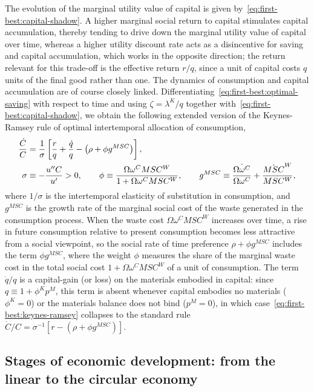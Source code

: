 The evolution of the marginal utility value of capital is given by~\eqref{eq:first-best:capital-shadow}. A higher marginal social return to capital stimulates capital accumulation, thereby tending to drive down the marginal utility value of capital over time, whereas a higher utility discount rate acts as a disincentive for saving and capital accumulation, which works in the opposite direction; the return relevant for this trade-off is the effective return $r/q$, since a unit of capital costs $q$ units of the final good rather than one. The dynamics of consumption and capital accumulation are of course closely linked. Differentiating~\eqref{eq:first-best:optimal-saving} with respect to time and using $\zeta=\lambda^K/q$ together with~\eqref{eq:first-best:capital-shadow}, we obtain the following extended version of the Keynes-Ramsey rule of optimal intertemporal allocation of consumption,
\begin{align}
\frac{\dot C}{C} &= \frac{1}{\sigma}\left[\frac{r}{q}+\frac{\dot q}{q} - \left(\rho + \phi g^{MSC}\right)\right],
\label{eq:first-best:keynes-ramsey}
\\
\sigma &\equiv -\frac{u''C}{u'} > 0,
\qquad
\phi \equiv \frac{\Omega\omega^C MSC^W}{1+\Omega\omega^C MSC^W},
\qquad
g^{MSC} \equiv \frac{\dot{\Omega\omega^C}}{\Omega\omega^C} + \frac{\dot{MSC}^W}{MSC^W},
\notag
\end{align}
where $1/\sigma$ is the intertemporal elasticity of substitution in consumption, and $g^{MSC}$ is the growth rate of the marginal social cost of the waste generated in the consumption process. When the waste cost $\Omega\omega^C MSC^W$ increases over time, a rise in future consumption relative to present consumption becomes less attractive from a social viewpoint, so the social rate of time preference $\rho + \phi g^{MSC}$ includes the term $\phi g^{MSC}$, where the weight $\phi$ measures the share of the marginal waste cost in the total social cost $1+\Omega\omega^C MSC^W$ of a unit of consumption. The term $\dot q/q$ is a capital-gain (or loss) on the materials embodied in capital: since $q\equiv1+\phi^Kp^M$, this term is absent whenever capital embodies no materials ($\phi^K=0$) or the materials balance does not bind ($p^M=0$), in which case~\eqref{eq:first-best:keynes-ramsey} collapses to the standard rule $\dot C/C=\sigma^{-1}\left[r-\left(\rho+\phi g^{MSC}\right)\right]$.

\subsection{Stages of economic development: from the linear to the circular economy}
\label{subsec:first-best-allocation:stages}

